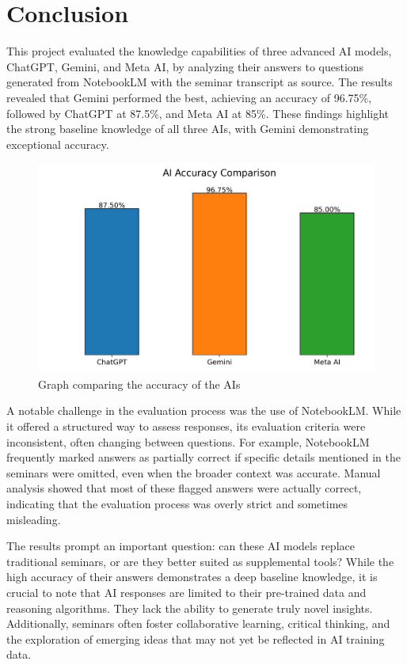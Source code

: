 \section{Conclusion}

This project evaluated the knowledge capabilities of three advanced AI models, ChatGPT, Gemini, and Meta AI, by analyzing
their answers to questions generated from NotebookLM with the seminar transcript as source. The results revealed that
Gemini performed the best, achieving an accuracy of 96.75\%, followed by ChatGPT at 87.5\%, and Meta AI at 85\%. 
These findings highlight the strong baseline knowledge of all three AIs, with Gemini demonstrating exceptional accuracy.
\begin{figure}[H]
    \centering
    \includegraphics[scale=0.75]{Imagens/graph.jpg}
    \caption{Graph comparing the accuracy of the AIs}
\end{figure}
A notable challenge in the evaluation process was the use of NotebookLM. While it offered a structured way to assess
responses, its evaluation criteria were inconsistent, often changing between questions. For example, NotebookLM 
frequently marked answers as partially correct if specific details mentioned in the seminars were omitted, even when the 
broader context was accurate. Manual analysis showed that most of these flagged answers were actually correct, 
indicating that the evaluation process was overly strict and sometimes misleading.

The results prompt an important question: can these AI models replace traditional seminars, or are they better suited as
supplemental tools? While the high accuracy of their answers demonstrates a deep baseline knowledge, 
it is crucial to note that AI responses are limited to their pre-trained data and reasoning algorithms. 
They lack the ability to generate truly novel insights. Additionally, seminars often foster collaborative 
learning, critical thinking, and the exploration of emerging ideas that may not yet be reflected in AI training data.


